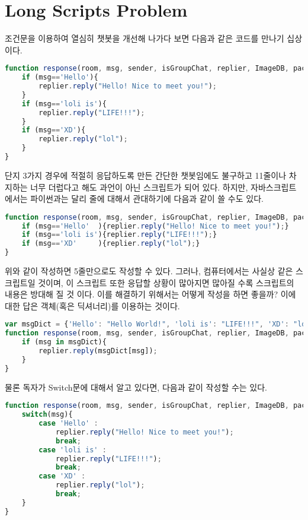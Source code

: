 \documentclass[10pt,b6paper,final]{book}
\begin{document}
\section{Long Scripts Problem}
조건문을 이용하여 열심히 챗봇을 개선해 나가다 보면 다음과 같은 코드를 만나기 십상이다.
\begin{lstlisting}[language=JavaScript,escapeinside=~~]
function response(room, msg, sender, isGroupChat, replier, ImageDB, packageName, threadId){
    if (msg=='Hello'){
        replier.reply("Hello! Nice to meet you!");
    }
    if (msg=='loli is'){
        replier.reply("LIFE!!!");
    }
    if (msg=='XD'){
        replier.reply("lol");
    }
}
\end{lstlisting}
단지 3가지 경우에 적절히 응답하도록 만든 간단한 챗봇임에도 불구하고 11줄이나 차지하는
너무 더럽다고 해도 과언이 아닌 스크립트가 되어 있다. 하지만, 자바스크립트에서는 파이썬과는 달리
줄에 대해서 관대하기에 다음과 같이 쓸 수도 있다.
\begin{lstlisting}[language=JavaScript,escapeinside=~~]
function response(room, msg, sender, isGroupChat, replier, ImageDB, packageName, threadId){
    if (msg=='Hello'  ){replier.reply("Hello! Nice to meet you!");}
    if (msg=='loli is'){replier.reply("LIFE!!!");}
    if (msg=='XD'     ){replier.reply("lol");}
}
\end{lstlisting}
위와 같이 작성하면 5줄만으로도 작성할 수 있다. 그러나, 컴퓨터에서는 사실상 같은 스크립트일 것이며, 이 스크립트 또한
응답할 상황이 많아지면 많아질 수록 스크립트의 내용은 방대해 질 것 이다. 이를 해결하기 위해서는
어떻게 작성을 하면 좋을까? 이에 대한 답은 객체(혹은 딕셔너리)를 이용하는 것이다.
\begin{lstlisting}[language=JavaScript,escapeinside=~~]
var msgDict = {'Hello': "Hello World!", 'loli is': "LIFE!!!", 'XD': "lol"};
function response(room, msg, sender, isGroupChat, replier, ImageDB, packageName, threadId){
    if (msg in msgDict){
        replier.reply(msgDict[msg]);
    }
}
\end{lstlisting}
물론 독자가 Switch문에 대해서 알고 있다면, 다음과 같이 작성할 수는 있다.
\begin{lstlisting}[language=JavaScript,escapeinside=~~]
function response(room, msg, sender, isGroupChat, replier, ImageDB, packageName, threadId){
    switch(msg){
        case 'Hello' :
            replier.reply("Hello! Nice to meet you!");
            break;
        case 'loli is' :
            replier.reply("LIFE!!!");
            break;
        case 'XD' :
            replier.reply("lol");
            break;
    }
}
\end{lstlisting}
\end{document}
